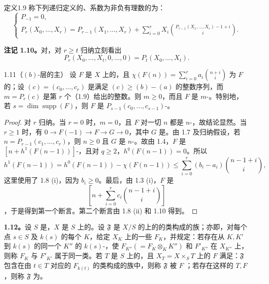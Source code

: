 \begin{SGAresult}{定义}{1.9}
称下列递归定义的、系数为非负有理数的为：
\[
\begin{cases}
P_{-1}=0,\\
P_r(X_0,\ldots,X_r)=P_{r-1}(X_1,\ldots,X_r)
+\displaystyle\sum_{i=0}^r X_i\binom{P_{r-1}(X_1,\ldots,X_r)-1+i}{i}.
\end{cases}
\]
\end{SGAresult}
\textbf{注记 1.10。}对，对 $r\geq t$ 归纳立刻看出
\[P_r(X_0,\ldots,X_t,0,\ldots,0)=P_t(X_0,\ldots,X_t).\]
\begin{SGAresult}{}{1.11（$(b)$-层的主）}
设 $F$ 是 $X$ 上的，且 $\chi(F(n))=\sum_{i=0}^r a_i\binom{n+i}{i}$ 为 $F$ 的；设 $(c)=(c_0,\ldots,c_r)$ 是满足 $(c)\geq(b)-(a)$ 的整数序列，而 $m=P_r(c)$ 是第 $r$ 个（1.9）给出的整数。则 $m\geq0$，而且 $F$ 是 $m$-。特别地，若 $s=\dim\operatorname{supp}(F)$，则 $F$ 是 $P_{s-1}(c_0,\ldots,c_{s-1})$-。
\end{SGAresult}
\begin{proof}
对 $r$ 归纳。当 $r=0$ 时，$m=0$，且 $F$ 对一切 $n$ 都是 $n$-，故结论显然。当 $r\geq1$ 时，有 $0\to F(-1)\to F\to G\to0$，其中 $G$ 是。由 1.7 及归纳假设，若 $n=P_{r-1}(c_1,\ldots,c_r)$，则 $n\geq0$ 且 $G$ 是 $n$-。故由 1.4，$F$ 是 $[n+h^1(F(n-1))]$-，且对 $q\geq2$，$h^q(F(n-1))=0$。所以
\[h^1(F(n-1))=h^0(F(n-1))-\chi(F(n-1))\leq\sum_{i=0}^r(b_i-a_i)\binom{n-1+i}{i},\]
这里使用了 1.8 (i)，因为 $b_i\geq0$。最后，由 1.3 (i)，$F$ 是
\[\left[n+\sum_{i=0}^r c_i\binom{n-1+i}{i}\right]\]
，于是得到第一个断言。第二个断言由 1.8 (ii) 和 1.10 得到。
\end{proof}
\textbf{1.12。}设 $S$ 是，$X$ 是 $S$ 上的。设 $\mathfrak F$ 是 $X/S$ 的上的的类构成的族；亦即，对每个点 $s\in S$ 及 $k(s)$ 的每个 $K$，给定 $X_K$ 上的一些 $F_K$，并规定：若存在从 $K,K'$ 到 $k(s)$ 的同一个 $K''$ 的 $k(s)$-，使 $F_{K''}(=F_K\otimes_KK'')$ 和 $F'_{K''}$ 在 $X_{K''}$ 上，则称 $F_K$ 与 $F'_{K'}$ 属于同一类。若 $T$ 是 $S$ 上的，且 $X_T=X\times_ST$ 上的 $F$ 满足：$\mathfrak F$ 包含在由 $t\in T$ 对应的 $F_{k(t)}$ 的类构成的族中，则称 $\mathfrak F$ 被 $F$ ；若存在这样的 $T,F$，则称 $\mathfrak F$ 为。

